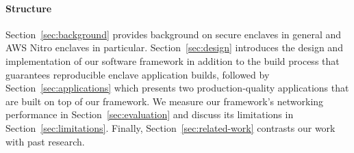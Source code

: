 \paragraph{Structure}

Section~\ref{sec:background} provides background on secure enclaves in general
and AWS Nitro enclaves in particular.  Section~\ref{sec:design} introduces the
design and implementation of our software framework in addition to the build
process that guarantees reproducible enclave application builds, followed by
Section~\ref{sec:applications} which presents two production-quality
applications that are built on top of our framework.  We measure our framework's
networking performance in Section~\ref{sec:evaluation} and discuss its
limitations in Section~\ref{sec:limitations}.  Finally,
Section~\ref{sec:related-work} contrasts our work with past research.
